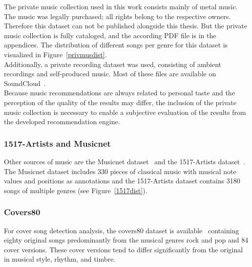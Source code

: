 The private music collection used in this work consists mainly of metal music. The music was legally purchased; all rights belong to the respective owners. Therefore this dataset can not be published alongside this thesis. But the private music collection is fully cataloged, and the according PDF file is in the appendices. The distribution of different songs per genre for this dataset is visualized in Figure~\ref{privmusdist}.\\
\noindent Additionally, a private recording dataset was used, consisting of ambient recordings and self-produced music. Most of these files are available on SoundCloud~\cite{bqpd1}.\\
Because music recommendations are always related to personal taste and the perception of the quality of the results may differ, the inclusion of the private music collection is necessary to enable a subjective evaluation of the results from the developed recommendation engine.

\subsubsection{1517-Artists and Musicnet}

Other sources of music are the Musicnet dataset~\cite{musicnet1} and the 1517-Artists dataset~\cite{1517artists1}. The Musicnet dataset includes 330 pieces of classical music with musical note values and positions as annotations and the 1517-Artists dataset contains 3180 songs of multiple genres (see Figure~\ref{1517dist}). 

\subsubsection{Covers80}\label{cov801}

For cover song detection analysis, the covers80 dataset is available~\cite{cover80} containing eighty original songs predominantly from the musical genres rock and pop and 84 cover versions. These cover versions tend to differ significantly from the original in musical style, rhythm, and timbre.

